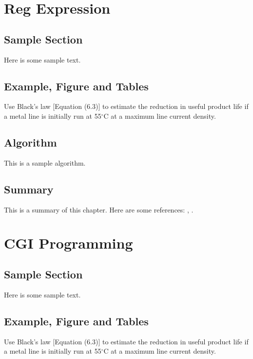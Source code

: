 \documentclass{wileySix}
\begin{document}
\chapter{Reg Expression}

\section{Sample Section}
Here is some sample text.

\section{Example, Figure and Tables}
\vskip6pt
\begin{example}
	Use Black's law [Equation (6.3)] to estimate the reduction in useful product
	life if a metal line is initially run at 55$^\circ$C at a maximum line
	current density.
\end{example}

\section{Algorithm}
This is a sample algorithm.

\section{Summary}
This is a summary of this chapter.
Here are some references: \cite{xkilby}, \cite{xberen}.

\chapter{CGI Programming}

\section{Sample Section}
Here is some sample text.

\section{Example, Figure and Tables}
\vskip6pt
\begin{example}
	Use Black's law [Equation (6.3)] to estimate the reduction in useful product
	life if a metal line is initially run at 55$^\circ$C at a maximum line
	current density.
\end{example}
\end{document}

